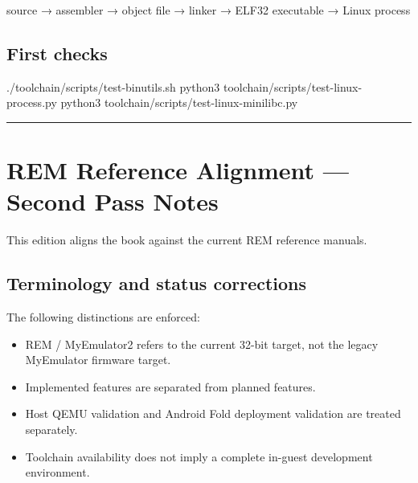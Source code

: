 \documentclass[
  oneside,
  openany]{book}
\newenvironment{Shaded}{\begin{snugshade}}{\end{snugshade}}
\newcommand{\ExtensionTok}[1]{#1}
\newcommand{\NormalTok}[1]{#1}
\providecommand{\tightlist}{%
  \setlength{\itemsep}{0pt}\setlength{\parskip}{0pt}}
\begin{document}
\begin{Shaded}
\begin{Highlighting}[]
\NormalTok{source}
\NormalTok{    → assembler}
\NormalTok{    → object file}
\NormalTok{    → linker}
\NormalTok{    → ELF32 executable}
\NormalTok{    → Linux process}
\end{Highlighting}
\end{Shaded}

\hypertarget{first-checks}{%
\section{First checks}\label{first-checks}}

\begin{Shaded}
\begin{Highlighting}[]
\ExtensionTok{./toolchain/scripts/test{-}binutils.sh}
\ExtensionTok{python3}\NormalTok{ toolchain/scripts/test{-}linux{-}process.py}
\ExtensionTok{python3}\NormalTok{ toolchain/scripts/test{-}linux{-}minilibc.py}
\end{Highlighting}
\end{Shaded}

\begin{center}\rule{0.5\linewidth}{0.5pt}\end{center}

\hypertarget{rem-reference-alignment-second-pass-notes}{%
\chapter{REM Reference Alignment --- Second Pass
Notes}\label{rem-reference-alignment-second-pass-notes}}

This edition aligns the book against the current REM reference manuals.

\hypertarget{terminology-and-status-corrections}{%
\section{Terminology and status
corrections}\label{terminology-and-status-corrections}}

The following distinctions are enforced:

\begin{itemize}
\tightlist
\item
  REM / MyEmulator2 refers to the current 32-bit target, not the legacy
  MyEmulator firmware target.
\item
  Implemented features are separated from planned features.
\item
  Host QEMU validation and Android Fold deployment validation are
  treated separately.
\item
  Toolchain availability does not imply a complete in-guest development
  environment.
\end{itemize}
\end{document}

